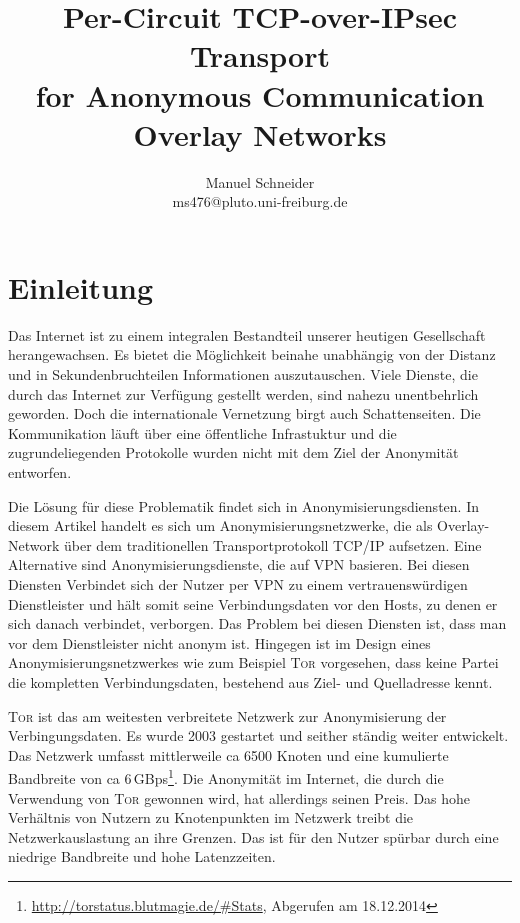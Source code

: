 \documentclass[fleqn,envcountsame,runningheads,10pt,a4paper]{llncs}
\begin{document}
\title{Per-Circuit TCP-over-IPsec Transport \\ for Anonymous Communication Overlay Networks} 
\author{Manuel Schneider \\ ms476@pluto.uni-freiburg.de}
\maketitle
\section{Einleitung}
\label{sec:intro}

Das Internet ist zu einem integralen Bestandteil unserer heutigen Gesellschaft herangewachsen. Es bietet die Möglichkeit beinahe unabhängig von der Distanz und in Sekundenbruchteilen Informationen auszutauschen. Viele Dienste, die durch das Internet zur Verfügung gestellt werden, sind nahezu unentbehrlich geworden. Doch die internationale Vernetzung birgt auch Schattenseiten. Die Kommunikation läuft über eine öffentliche Infrastuktur und die zugrundeliegenden Protokolle wurden nicht mit dem Ziel der Anonymität entworfen.

Die Lösung für diese Problematik findet sich in Anonymisierungsdiensten. In diesem Artikel handelt es sich um Anonymisierungsnetzwerke, die als Overlay-Network über dem traditionellen Transportprotokoll TCP/IP aufsetzen. Eine Alternative sind Anonymisierungsdienste, die auf VPN basieren. Bei diesen Diensten Verbindet sich der Nutzer per VPN zu einem vertrauenswürdigen Dienstleister und hält somit seine Verbindungsdaten vor den Hosts, zu denen er sich danach verbindet, verborgen. Das Problem bei diesen Diensten ist, dass man vor dem Dienstleister nicht anonym ist. Hingegen ist im Design eines Anonymisierungsnetzwerkes wie zum Beispiel \textsc{Tor} vorgesehen, dass keine Partei die kompletten Verbindungsdaten, bestehend aus Ziel- und Quelladresse kennt.

\textsc{Tor} ist das am weitesten verbreitete Netzwerk zur Anonymisierung der Verbingungsdaten. Es wurde 2003 gestartet und seither ständig weiter entwickelt. Das Netzwerk umfasst mittlerweile ca 6500 Knoten und eine kumulierte Bandbreite von ca 6\,GBps\footnote{\url{http://torstatus.blutmagie.de/\#Stats}, Abgerufen am 18.12.2014}.  Die Anonymität im Internet, die durch die Verwendung von \textsc{Tor} gewonnen wird, hat allerdings seinen Preis. Das hohe Verhältnis von Nutzern zu Knotenpunkten im Netzwerk treibt die Netzwerkauslastung an ihre Grenzen. Das ist für den Nutzer spürbar durch eine niedrige Bandbreite und hohe Latenzzeiten.
\end{document}
